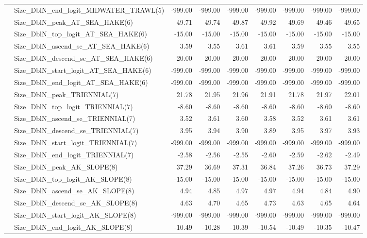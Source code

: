 \documentclass[
]{scrartcl}
\begin{document}
\begin{landscape}
\begin{longtable}{llrrrrrrr}
 & Size\_DblN\_end\_logit\_MIDWATER\_TRAWL(5) & -999.00 & -999.00 & -999.00 & -999.00 & -999.00 & -999.00 & -999.00 \\ 
 & Size\_DblN\_peak\_AT\_SEA\_HAKE(6) & 49.71 & 49.74 & 49.87 & 49.92 & 49.69 & 49.46 & 49.65 \\ 
 & Size\_DblN\_top\_logit\_AT\_SEA\_HAKE(6) & -15.00 & -15.00 & -15.00 & -15.00 & -15.00 & -15.00 & -15.00 \\ 
 & Size\_DblN\_ascend\_se\_AT\_SEA\_HAKE(6) & 3.59 & 3.55 & 3.61 & 3.61 & 3.59 & 3.55 & 3.55 \\ 
 & Size\_DblN\_descend\_se\_AT\_SEA\_HAKE(6) & 20.00 & 20.00 & 20.00 & 20.00 & 20.00 & 20.00 & 20.00 \\ 
 & Size\_DblN\_start\_logit\_AT\_SEA\_HAKE(6) & -999.00 & -999.00 & -999.00 & -999.00 & -999.00 & -999.00 & -999.00 \\ 
 & Size\_DblN\_end\_logit\_AT\_SEA\_HAKE(6) & -999.00 & -999.00 & -999.00 & -999.00 & -999.00 & -999.00 & -999.00 \\ 
 & Size\_DblN\_peak\_TRIENNIAL(7) & 21.78 & 21.95 & 21.96 & 21.91 & 21.78 & 21.97 & 22.01 \\ 
 & Size\_DblN\_top\_logit\_TRIENNIAL(7) & -8.60 & -8.60 & -8.60 & -8.60 & -8.60 & -8.60 & -8.60 \\ 
 & Size\_DblN\_ascend\_se\_TRIENNIAL(7) & 3.52 & 3.61 & 3.60 & 3.58 & 3.52 & 3.61 & 3.61 \\ 
 & Size\_DblN\_descend\_se\_TRIENNIAL(7) & 3.95 & 3.94 & 3.90 & 3.89 & 3.95 & 3.97 & 3.93 \\ 
 & Size\_DblN\_start\_logit\_TRIENNIAL(7) & -999.00 & -999.00 & -999.00 & -999.00 & -999.00 & -999.00 & -999.00 \\ 
 & Size\_DblN\_end\_logit\_TRIENNIAL(7) & -2.58 & -2.56 & -2.55 & -2.60 & -2.59 & -2.62 & -2.49 \\ 
 & Size\_DblN\_peak\_AK\_SLOPE(8) & 37.29 & 36.69 & 37.31 & 36.84 & 37.26 & 36.73 & 37.29 \\ 
 & Size\_DblN\_top\_logit\_AK\_SLOPE(8) & -15.00 & -15.00 & -15.00 & -15.00 & -15.00 & -15.00 & -15.00 \\ 
 & Size\_DblN\_ascend\_se\_AK\_SLOPE(8) & 4.94 & 4.85 & 4.97 & 4.97 & 4.94 & 4.84 & 4.90 \\ 
 & Size\_DblN\_descend\_se\_AK\_SLOPE(8) & 4.63 & 4.70 & 4.65 & 4.73 & 4.63 & 4.65 & 4.64 \\ 
 & Size\_DblN\_start\_logit\_AK\_SLOPE(8) & -999.00 & -999.00 & -999.00 & -999.00 & -999.00 & -999.00 & -999.00 \\ 
 & Size\_DblN\_end\_logit\_AK\_SLOPE(8) & -10.49 & -10.28 & -10.39 & -10.54 & -10.49 & -10.35 & -10.47 \\ 

\end{longtable}
\end{landscape}
\end{document}
